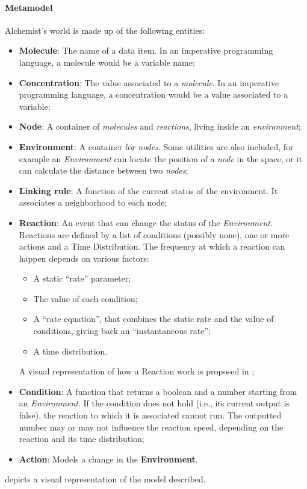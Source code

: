 \paragraph{Metamodel} Alchemist's world is made up of the following entities:
\begin{itemize}
	\item \textbf{Molecule}: The name of a data item. In an imperative programming language, a molecule would be a variable name;
	\item \textbf{Concentration}: The value associated to a \textit{molecule}. In an imperative programming language, a concentration would be a value associated to a variable;
	\item \textbf{Node}: A container of \textit{molecules} and \textit{reactions}, living inside an \textit{environment};
	\item \textbf{Environment}: A container for \textit{nodes}. Some utilities are also included, for example an \textit{Environment} can locate the position of a \textit{node} in the space, or it can calculate the distance between two \textit{nodes};
	\item \textbf{Linking rule}: A function of the current status of the environment. It associates a neighborhood to each node;
	\item \textbf{Reaction}: An event that can change the status of the \textit{Environment}. Reactions are defined by a list of conditions (possibly none), one or more actions and  a Time Distribution. The frequency at which a reaction can happen depends on various factors:
	\begin{itemize}
		\item A static “rate” parameter;
		\item The value of each condition;
		\item A “rate equation”, that combines the static rate and the value of conditions, giving back an “instantaneous rate”;
		\item A time distribution.
	\end{itemize}
	A visual representation of how a Reaction work is proposed in ;
	\item \textbf{Condition}: A function that returns a boolean and a number starting from an \textit{Environment}. If the condition does not hold (i.e., its current output is false), the reaction to which it is associated cannot run.
	The outputted number may or may not influence the reaction speed, depending on the reaction and its time distribution;
	\item \textbf{Action}: Models a change in the \textbf{Environment}.
\end{itemize}
 depicts a visual representation of the model described.

